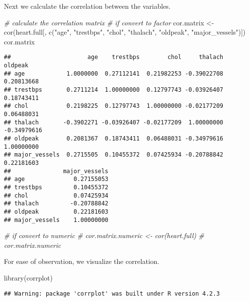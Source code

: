 \documentclass[
]{article}
\newenvironment{Shaded}{\begin{snugshade}}{\end{snugshade}}
\newcommand{\CommentTok}[1]{\textcolor[rgb]{0.56,0.35,0.01}{\textit{#1}}}
\newcommand{\FunctionTok}[1]{\textcolor[rgb]{0.00,0.00,0.00}{#1}}
\newcommand{\NormalTok}[1]{#1}
\newcommand{\OtherTok}[1]{\textcolor[rgb]{0.56,0.35,0.01}{#1}}
\newcommand{\StringTok}[1]{\textcolor[rgb]{0.31,0.60,0.02}{#1}}
\begin{document}
Next we calculate the correlation between the variables.

\begin{Shaded}
\begin{Highlighting}[]
\CommentTok{\# calculate the correlation matrix}
\CommentTok{\# if convert to factor}
\NormalTok{cor.matrix }\OtherTok{\textless{}{-}} \FunctionTok{cor}\NormalTok{(heart.full[, }\FunctionTok{c}\NormalTok{(}\StringTok{"age"}\NormalTok{, }\StringTok{"trestbps"}\NormalTok{, }\StringTok{"chol"}\NormalTok{, }\StringTok{"thalach"}\NormalTok{, }\StringTok{"oldpeak"}\NormalTok{, }\StringTok{"major\_vessels"}\NormalTok{)])}
\NormalTok{cor.matrix}
\end{Highlighting}
\end{Shaded}

\begin{verbatim}
##                      age    trestbps        chol     thalach     oldpeak
## age            1.0000000  0.27112141  0.21982253 -0.39022708  0.20813668
## trestbps       0.2711214  1.00000000  0.12797743 -0.03926407  0.18743411
## chol           0.2198225  0.12797743  1.00000000 -0.02177209  0.06488031
## thalach       -0.3902271 -0.03926407 -0.02177209  1.00000000 -0.34979616
## oldpeak        0.2081367  0.18743411  0.06488031 -0.34979616  1.00000000
## major_vessels  0.2715505  0.10455372  0.07425934 -0.20788842  0.22181603
##               major_vessels
## age              0.27155053
## trestbps         0.10455372
## chol             0.07425934
## thalach         -0.20788842
## oldpeak          0.22181603
## major_vessels    1.00000000
\end{verbatim}

\begin{Shaded}
\begin{Highlighting}[]
\CommentTok{\# if convert to numeric}
\CommentTok{\# cor.matrix.numeric \textless{}{-} cor(heart.full)}
\CommentTok{\# cor.matrix.numeric}
\end{Highlighting}
\end{Shaded}

For ease of observation, we visualize the correlation.

\begin{Shaded}
\begin{Highlighting}[]
\FunctionTok{library}\NormalTok{(corrplot)}
\end{Highlighting}
\end{Shaded}

\begin{verbatim}
## Warning: package 'corrplot' was built under R version 4.2.3
\end{verbatim}
\end{document}
